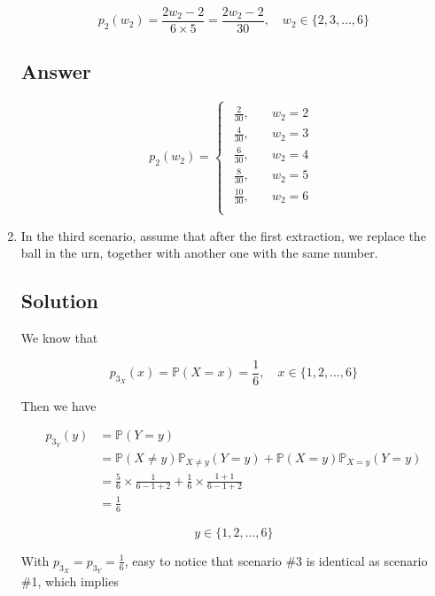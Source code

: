 \documentclass[12pt]{article}
\newcommand{\bP}{\mathbb{P}}
\begin{document}
\begin{enumerate}[start=1,label={\bfseries Part \arabic*:},leftmargin=0in]
			\[p_2(w_2) = \frac{2w_2-2}{6\times 5} = \frac{2w_2-2}{30},\quad w_2\in \{2,3,\dots,6\}\]
		
		\subsection*{Answer}
		
			\[\boxed{p_2(w_2) =
				\begin{cases}
					\begin{aligned}
						\frac{2}{30},&\quad w_2 = 2\\
						\frac{4}{30},&\quad w_2 = 3\\
						\frac{6}{30},&\quad w_2 = 4\\
						\frac{8}{30},&\quad w_2 = 5\\
						\frac{10}{30},&\quad w_2 = 6\\
					\end{aligned}
			\end{cases}}\]
			
		\bigskip\item In the third scenario, assume that after the first extraction, we replace the ball in the urn, together with another one with the same number.
		
		\subsection*{Solution}
		
			We know that
			
			\[p_{3_X}(x) = \bP(X = x) = \frac{1}{6},\quad x\in\{1,2,\dots,6\}\]
			
			Then we have
			
			\[
			\begin{aligned}
				p_{3_Y}(y) &= \bP(Y = y)\\
				&= \bP(X \ne y)\bP_{X \ne y}(Y = y) + \bP(X = y)\bP_{X = y}(Y = y)\\
				&= \frac{5}{6}\times \frac{1}{6-1+2} + \frac{1}{6}\times \frac{1+1}{6-1+2}\\
				&= \frac{1}{6}
			\end{aligned}
			\]
			
			\[y\in\{1,2,\dots,6\}\]
			
			With $p_{3_X} = p_{3_Y} = \frac{1}{6}$, easy to notice that scenario \#3 is identical as scenario \#1, which implies
			

\end{enumerate}
\end{document}
